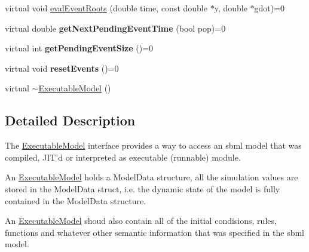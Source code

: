 \begin{DoxyCompactItemize}
\item 
virtual void \hyperlink{classrr_1_1_executable_model_a7b6f43b8a273ac54aa5c8776c75bf1e2}{eval\-Event\-Roots} (double time, const double $\ast$y, double $\ast$gdot)=0
\item 
\hypertarget{classrr_1_1_executable_model_ad80b6a7167b0a78364dc680475ab2e3c}{virtual double {\bfseries get\-Next\-Pending\-Event\-Time} (bool pop)=0}\label{classrr_1_1_executable_model_ad80b6a7167b0a78364dc680475ab2e3c}

\item 
\hypertarget{classrr_1_1_executable_model_a9875c1203e09d4d51c29fdb2318f9a4c}{virtual int {\bfseries get\-Pending\-Event\-Size} ()=0}\label{classrr_1_1_executable_model_a9875c1203e09d4d51c29fdb2318f9a4c}

\item 
\hypertarget{classrr_1_1_executable_model_a936756fa4facd2b182b4cfcbe0f07fab}{virtual void {\bfseries reset\-Events} ()=0}\label{classrr_1_1_executable_model_a936756fa4facd2b182b4cfcbe0f07fab}

\item 
virtual \hyperlink{classrr_1_1_executable_model_a7d670c92b720d7dcf3ab70fa9d1b14d0}{$\sim$\-Executable\-Model} ()
\end{DoxyCompactItemize}


\subsection{Detailed Description}
The \hyperlink{classrr_1_1_executable_model}{Executable\-Model} interface provides a way to access an sbml model that was compiled, J\-I\-T'd or interpreted as executable (runnable) module.

An \hyperlink{classrr_1_1_executable_model}{Executable\-Model} holds a Model\-Data structure, all the simulation values are stored in the Model\-Data struct, i.\-e. the dynamic state of the model is fully contained in the Model\-Data structure.

An \hyperlink{classrr_1_1_executable_model}{Executable\-Model} shoud also contain all of the initial condisions, rules, functions and whatever other semantic information that was specified in the sbml model. 

